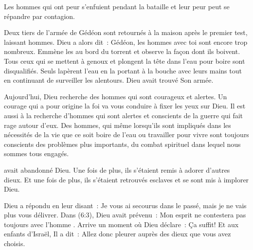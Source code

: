 Les hommes qui ont peur s'enfuient pendant la bataille et leur peur peut
 se répandre par contagion.


Deux tiers de l'armée de Gédéon sont retournés à la maison
 après le premier test, laissant  hommes.
 Dieu a alors dit~:
 \og Gédéon, les hommes avec toi sont encore trop nombreux.
 Emmène les au bord du torrent et observe la façon dont ils boivent.
 Tous ceux qui se mettent à genoux et plongent la tête dans l'eau pour boire
 sont disqualifiés. \fg{}
 Seuls  lapèrent l'eau en la portant à la bouche avec leurs mains
 tout en continuant de surveiller les alentours. Dieu avait trouvé Son armée.

Aujourd'hui, Dieu recherche des hommes qui sont courageux et alertes.
 Un courage qui a pour origine la foi va vous conduire
 à fixer les yeux sur Dieu. Il est aussi à la recherche d'hommes
 qui sont alertes et conscients de la guerre qui fait rage autour d'eux.
 Des hommes, qui même lorsqu'ils sont impliqués dans les nécessités de la vie
 \ocadr que ce soit boire de l'eau ou travailler pour vivre \fcadr{}
 sont toujours conscients des problèmes plus importants,
 du combat spirituel dans lequel nous sommes tous engagés. 

\dvrule






 avait abandonné Dieu.
 Une fois de plus, ils s'étaient remis à adorer d'autres dieux.
 Et une fois de plus, ils s'étaient retrouvés esclaves
 et se sont mis à implorer Dieu.

Dieu a répondu en leur disant~:
 \og Je vous ai secourus dans le passé,
 mais je ne vais plus vous délivrer. \fg{}
 Dans (6:3), Dieu avait prévenu~:
 \og Mon esprit ne contestera pas toujours avec l'homme \fg{}.
 Arrive un moment où Dieu déclare~: \og Ça suffit! \fg{}
 Et aux enfants d'Israël, Il a dit~:
 \og Allez donc pleurer auprès des dieux que vous avez choisis. \fg{}

